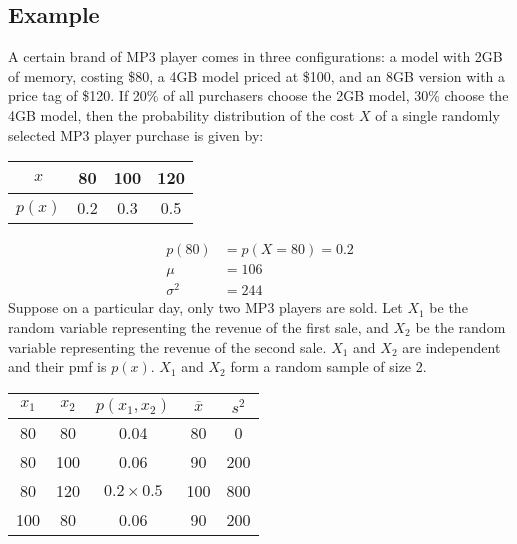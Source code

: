 \documentclass{math}
\begin{document}
\subsection*{Example}
A certain brand of MP3 player comes in three configurations: a model with 2GB
of memory, costing \$80, a 4GB model priced at \$100, and an 8GB version with
a price tag of \$120. If 20\% of all purchasers choose the 2GB model, 30\%
choose the 4GB model, then the probability distribution of the cost \( X \) of
a single randomly selected MP3 player purchase is given by:
\begin{center}
  \begin{tabular}{|c|c|c|c|}
    \hline
    \( x \) & 80 & 100 & 120 \\
    \hline
    \( p(x) \) & 0.2 & 0.3 & 0.5 \\
    \hline
  \end{tabular}
\end{center}
\begin{align*}
  p(80) &= p(X=80) = 0.2 \\
  \mu &= 106 \\
  \sigma^{2} &= 244
\end{align*}
Suppose on a particular day, only two MP3 players are sold. Let \( X_{1} \) be
the random variable representing the revenue of the first sale, and \( X_{2} \)
be the random variable representing the revenue of the second sale. \( X_{1} \)
and \( X_{2} \) are independent and their pmf is \( p(x) \). \( X_{1} \) and
\( X_{2} \) form a random sample of size 2.
\begin{center}
  \begin{tabular}{|c|c|c|c|c|}
    \hline
    \( x_{1} \) & \( x_{2} \) & \( p(x_{1},x_{2}) \) & \( \overline{x} \) &
      \( s^{2} \) \\
    \hline
    80 & 80 & 0.04 & 80 & 0 \\
    \hline
    80 & 100 & 0.06 & 90 & 200 \\
    \hline
    80 & 120 & \( 0.2\times0.5 \) & 100 & 800 \\
    \hline
    100 & 80 & 0.06 & 90 & 200 \\
    \hline
  \end{tabular}
\end{center}
\end{document}
